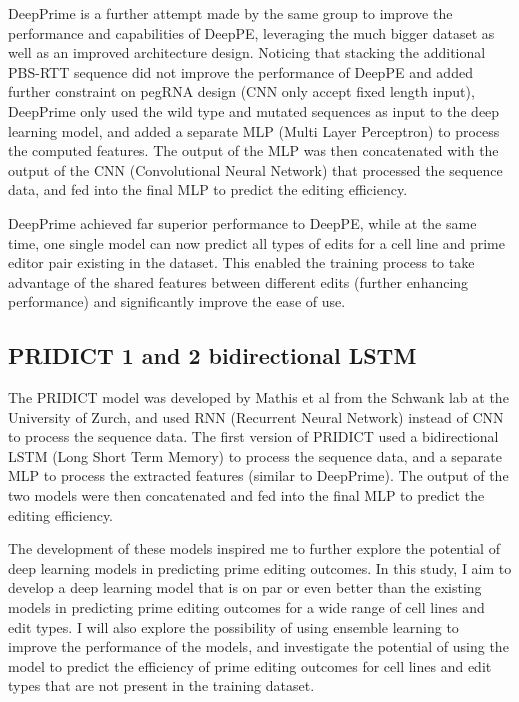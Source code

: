 DeepPrime is a further attempt made by the same group to improve the performance and capabilities of DeepPE, leveraging the much bigger dataset as well as an improved architecture design\cite{yuPredictionEfficienciesDiverse2023}.
Noticing that stacking the additional PBS-RTT sequence did not improve the performance of DeepPE and added further constraint on pegRNA design (CNN only accept fixed length input), DeepPrime only used the wild type and mutated sequences as input to the deep learning model, and added a separate MLP (Multi Layer Perceptron) to process the computed features. The output of the MLP was then concatenated with the output of the CNN (Convolutional Neural Network) that processed the sequence data, and fed into the final MLP to predict the editing efficiency. 

DeepPrime achieved far superior performance to DeepPE, while at the same time, one single model can now predict all types of edits for a cell line and prime editor pair existing in the dataset. This enabled the training process to take advantage of the shared features between different edits (further enhancing performance) and significantly improve the ease of use.

\subsection{PRIDICT 1 and 2 bidirectional LSTM}

The PRIDICT model was developed by Mathis et al from the Schwank lab at the University of Zurch, and used RNN (Recurrent Neural Network) instead of CNN to process the sequence data\cite{mathisPredictingPrimeEditing2023}. The first version of PRIDICT used a bidirectional LSTM (Long Short Term Memory) to process the sequence data, and a separate MLP to process the extracted features (similar to DeepPrime). The output of the two models were then concatenated and fed into the final MLP to predict the editing efficiency.

The development of these models inspired me to further explore the potential of deep learning models in predicting prime editing outcomes. In this study, I aim to develop a deep learning model that is on par or even better than the existing models in predicting prime editing outcomes for a wide range of cell lines and edit types. I will also explore the possibility of using ensemble learning to improve the performance of the models, and investigate the potential of using the model to predict the efficiency of prime editing outcomes for cell lines and edit types that are not present in the training dataset. 